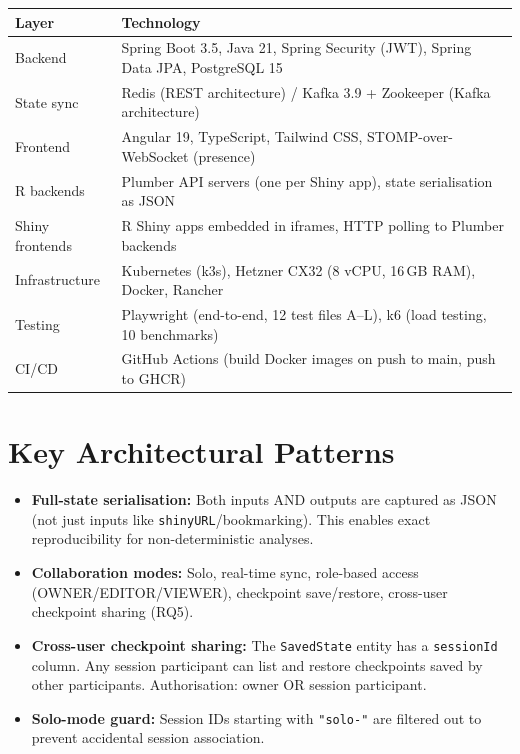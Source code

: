 \documentclass[12pt,a4paper]{article}
\begin{document}
\begin{table}[h]
\centering
\begin{tabular}{@{}ll@{}}
\toprule
\textbf{Layer} & \textbf{Technology} \\
\midrule
Backend        & Spring Boot 3.5, Java 21, Spring Security (JWT), Spring Data JPA, PostgreSQL 15 \\
State sync     & Redis (REST architecture) / Kafka 3.9 + Zookeeper (Kafka architecture) \\
Frontend       & Angular 19, TypeScript, Tailwind CSS, STOMP-over-WebSocket (presence) \\
R backends     & Plumber API servers (one per Shiny app), state serialisation as JSON \\
Shiny frontends & R Shiny apps embedded in iframes, HTTP polling to Plumber backends \\
Infrastructure & Kubernetes (k3s), Hetzner CX32 (8 vCPU, 16\,GB RAM), Docker, Rancher \\
Testing        & Playwright (end-to-end, 12 test files A--L), k6 (load testing, 10 benchmarks) \\
CI/CD          & GitHub Actions (build Docker images on push to main, push to GHCR) \\
\bottomrule
\end{tabular}
\end{table}

\section{Key Architectural Patterns}

\begin{itemize}[nosep]
  \item \textbf{Full-state serialisation:} Both inputs AND outputs are captured
        as JSON (not just inputs like \texttt{shinyURL}/bookmarking). This enables
        exact reproducibility for non-deterministic analyses.

  \item \textbf{Collaboration modes:} Solo, real-time sync, role-based access
        (OWNER/EDITOR/VIEWER), checkpoint save/restore, cross-user checkpoint
        sharing (RQ5).

  \item \textbf{Cross-user checkpoint sharing:} The \texttt{SavedState} entity
        has a \texttt{sessionId} column. Any session participant can list and
        restore checkpoints saved by other participants. Authorisation: owner
        OR session participant.

  \item \textbf{Solo-mode guard:} Session IDs starting with \texttt{"solo-"}
        are filtered out to prevent accidental session association.
\end{itemize}
\end{document}
